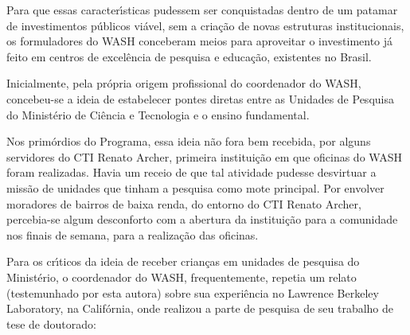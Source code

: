 \documentclass[
12pt,		%
openright,	%
twoside,  %
a4paper,			%
chapter=TITLE,		%
english,			%
french,				%
spanish,			%
brazil				%
]{USPSC-classe/USPSC}
\begin{document}
Para que essas caracter\'{\i}sticas pudessem ser conquistadas dentro de um patamar de investimentos p\'ublicos vi\'avel, sem a cria\c{c}\~ao de novas estruturas institucionais, os formuladores do WASH conceberam meios para aproveitar o investimento j\'a feito em centros de excel\^encia de pesquisa e educa\c{c}\~ao, existentes no Brasil.









Inicialmente, pela pr\'opria origem profissional do coordenador do WASH, concebeu-se a ideia de estabelecer pontes diretas entre as Unidades de Pesquisa do Minist\'erio de Ci\^encia e Tecnologia e o ensino fundamental.









Nos prim\'ordios do Programa, essa ideia n\~ao fora bem recebida, por alguns servidores do CTI Renato Archer, primeira institui\c{c}\~ao em que oficinas do WASH foram realizadas. Havia um receio de que tal atividade pudesse \textquotedbl  desvirtuar \textquotedbl  a miss\~ao de unidades que tinham a pesquisa como mote principal. Por envolver moradores de bairros de baixa renda, do entorno do CTI Renato Archer, percebia-se algum desconforto com a abertura da institui\c{c}\~ao para a comunidade nos finais de semana, para a realiza\c{c}\~ao das oficinas.









Para os cr\'{\i}ticos da ideia de receber crian\c{c}as em unidades de pesquisa do Minist\'erio, o coordenador do WASH, frequentemente, repetia um relato (testemunhado por esta autora) sobre sua experi\^encia no Lawrence Berkeley Laboratory, na Calif\'ornia, onde realizou a parte de pesquisa de seu trabalho de tese de doutorado:










\noindent\begin{center}\mbox{\centering{}}\end{center}
\end{document}
